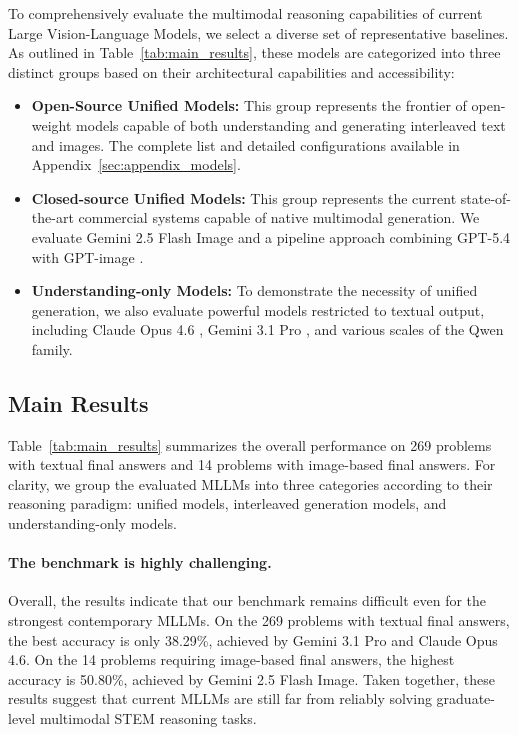 \documentclass[11pt]{article}
\begin{document}
To comprehensively evaluate the multimodal reasoning capabilities of current Large Vision-Language Models, we select a diverse set of representative baselines. As outlined in Table~\ref{tab:main_results}, these models are categorized into three distinct groups based on their architectural capabilities and accessibility:
\begin{itemize}
    \item \textbf{Open-Source Unified Models:} This group represents the frontier of open-weight models capable of both understanding and generating interleaved text and images. The complete list and detailed configurations available in Appendix~\ref{sec:appendix_models}.
    \item \textbf{Closed-source Unified Models:} This group represents the current state-of-the-art commercial systems capable of native multimodal generation. We evaluate Gemini 2.5 Flash Image \cite{google_gemini25_flash_image_2025} and a pipeline approach combining GPT-5.4 with GPT-image \cite{openai_gpt54_2026,openai_gpt_image_1}.
    \item \textbf{Understanding-only Models:} To demonstrate the necessity of unified generation, we also evaluate powerful models restricted to textual output, including Claude Opus 4.6 \cite{anthropic_claude_opus46_2026}, Gemini 3.1 Pro \cite{google_gemini31_pro_2026}, and various scales of the Qwen family.
\end{itemize}

\subsection{Main Results}
\label{sec:main_results}


Table~\ref{tab:main_results} summarizes the overall performance on 269 problems with textual final answers and 14 problems with image-based final answers. For clarity, we group the evaluated MLLMs into three categories according to their reasoning paradigm: unified models, interleaved generation models, and understanding-only models.

\paragraph{The benchmark is highly challenging.}
Overall, the results indicate that our benchmark remains difficult even for the strongest contemporary MLLMs. On the 269 problems with textual final answers, the best accuracy is only 38.29\%, achieved by Gemini 3.1 Pro and Claude Opus 4.6. On the 14 problems requiring image-based final answers, the highest accuracy is 50.80\%, achieved by Gemini 2.5 Flash Image. Taken together, these results suggest that current MLLMs are still far from reliably solving graduate-level multimodal STEM reasoning tasks.
\end{document}

